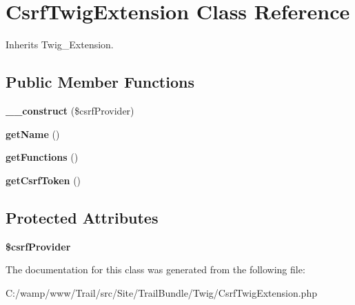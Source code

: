 \hypertarget{class_site_1_1_trail_bundle_1_1_twig_1_1_csrf_twig_extension}{}\section{Csrf\+Twig\+Extension Class Reference}
\label{class_site_1_1_trail_bundle_1_1_twig_1_1_csrf_twig_extension}


Inherits Twig\+\_\+\+Extension.

\subsection*{Public Member Functions}
\begin{DoxyCompactItemize}
\item 
\hypertarget{class_site_1_1_trail_bundle_1_1_twig_1_1_csrf_twig_extension_a4ca0d66caf7add439b64f35af9d0150e}{}{\bfseries \+\_\+\+\_\+construct} (\$csrf\+Provider)\label{class_site_1_1_trail_bundle_1_1_twig_1_1_csrf_twig_extension_a4ca0d66caf7add439b64f35af9d0150e}

\item 
\hypertarget{class_site_1_1_trail_bundle_1_1_twig_1_1_csrf_twig_extension_a3d0963e68bb313b163a73f2803c64600}{}{\bfseries get\+Name} ()\label{class_site_1_1_trail_bundle_1_1_twig_1_1_csrf_twig_extension_a3d0963e68bb313b163a73f2803c64600}

\item 
\hypertarget{class_site_1_1_trail_bundle_1_1_twig_1_1_csrf_twig_extension_a131c2522f07821f77cd1d038c216031b}{}{\bfseries get\+Functions} ()\label{class_site_1_1_trail_bundle_1_1_twig_1_1_csrf_twig_extension_a131c2522f07821f77cd1d038c216031b}

\item 
\hypertarget{class_site_1_1_trail_bundle_1_1_twig_1_1_csrf_twig_extension_ae82e810c7cab63402dda090587a425eb}{}{\bfseries get\+Csrf\+Token} ()\label{class_site_1_1_trail_bundle_1_1_twig_1_1_csrf_twig_extension_ae82e810c7cab63402dda090587a425eb}

\end{DoxyCompactItemize}
\subsection*{Protected Attributes}
\begin{DoxyCompactItemize}
\item 
\hypertarget{class_site_1_1_trail_bundle_1_1_twig_1_1_csrf_twig_extension_a17785402c7bfdc823372afcfd740f704}{}{\bfseries \$csrf\+Provider}\label{class_site_1_1_trail_bundle_1_1_twig_1_1_csrf_twig_extension_a17785402c7bfdc823372afcfd740f704}

\end{DoxyCompactItemize}


The documentation for this class was generated from the following file\+:\begin{DoxyCompactItemize}
\item 
C\+:/wamp/www/\+Trail/src/\+Site/\+Trail\+Bundle/\+Twig/Csrf\+Twig\+Extension.\+php\end{DoxyCompactItemize}
